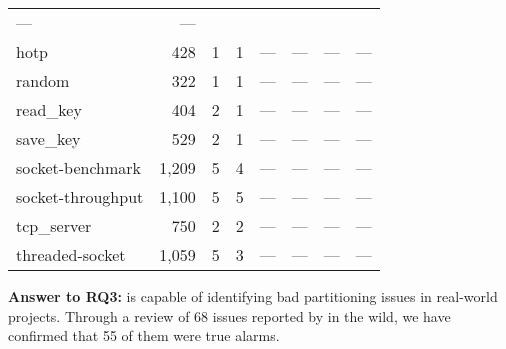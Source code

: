 \begin{table*}[t]
{\begin{tabular}{lr cc | cc | cc}
                                      --- & --- \\
            hotp & 428 & 1 & 1 & 
                       --- & --- &
                       --- & --- \\
            random & 322 & 1 & 1 & 
                       --- & --- &
                       --- & --- \\
            read\_key & 404 & 2 & 1 & 
                       --- & --- &
                       --- & --- \\
            save\_key & 529 & 2 & 1 & 
                       --- & --- &
                       --- & --- \\
            socket-benchmark & 1,209 & 5 & 4 & 
                       --- & --- &
                       --- & --- \\
            socket-throughput & 1,100 & 5 & 5 & 
                       --- & --- &
                       --- & --- \\
            tcp\_server & 750 & 2 & 2 & 
                       --- & --- &
                       --- & --- \\
            threaded-socket & 1,059 & 5 & 3 & 
                       --- & --- &
                       --- & --- \\
		\bottomrule
	\end{tabular}
    }
\end{table*}

\begin{tcolorbox} [colback=gray!20!white]
\textbf{Answer to RQ3:} 
\ccSysName is capable of identifying bad partitioning issues in real-world projects.
Through a review of 68 issues reported by \ccSysName in the wild, we have confirmed that 55 of them were true alarms.
\end{tcolorbox}
